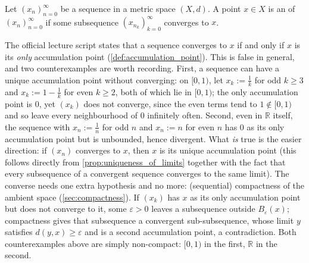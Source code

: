 \begin{definition}
\label{def:accumulation_point}
Let $(x_n)_{n=0}^{\infty}$ be a sequence in a metric space $(X,d)$. A point $x \in X$ is an
  of $(x_n)_{n=0}^{\infty}$ if some
subsequence $(x_{n_k})_{k=0}^{\infty}$ converges to $x$.
\end{definition}

\begin{remark}
The official lecture script states that a sequence converges to $x$ if and only if $x$ is its
\emph{only} accumulation point (\cref{def:accumulation_point}). This is
false in general, and two counterexamples are worth recording. First, a sequence can have a
unique accumulation point without converging: on $[0,1)$, let $x_k := \tfrac1k$ for odd
$k \geq 3$ and $x_k := 1-\tfrac1k$ for even $k \geq 2$, both of which lie in $[0,1)$; the only
accumulation point is $0$, yet $(x_k)$ does not converge, since the even terms tend to
$1 \notin [0,1)$ and so leave every neighbourhood of $0$ infinitely often. Second,
even in $\mathbb{R}$ itself, the sequence with $x_n := \tfrac1n$ for odd $n$ and $x_n := n$ for
even $n$ has $0$ as its only accumulation point but is unbounded, hence divergent. What \emph{is}
true is the easier direction: if $(x_n)$ converges to $x$, then $x$ is its unique accumulation
point (this follows directly from \cref{prop:uniqueness_of_limits} together with the fact that
every subsequence of a convergent sequence converges to the same limit). The converse needs one
extra hypothesis and no more: (sequential) compactness of the ambient space
(\cref{sec:compactness}). If $(x_k)$ has $x$ as its only accumulation point but does not converge
to it, some $\varepsilon>0$ leaves a subsequence outside $B_\varepsilon(x)$; compactness gives
that subsequence a convergent sub-subsequence, whose limit $y$ satisfies
$d(y,x) \geq \varepsilon$ and is a second accumulation point, a contradiction. Both
counterexamples above are simply non-compact: $[0,1)$ in the first, $\mathbb{R}$ in the second.
\end{remark}

